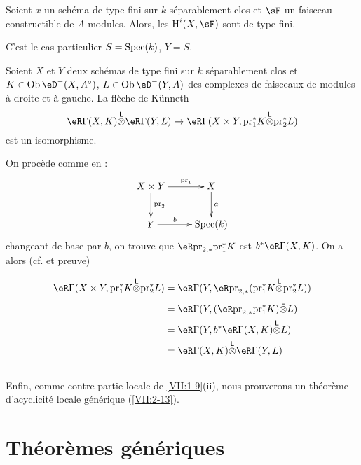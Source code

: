 \begin{corollary_}\label{VII:1-10}
Soient $x$ un schéma de type fini sur $k$ séparablement clos et $\sF$ un 
faisceau constructible de $A$-modules. Alors, les $\h^i(X,\sF)$ sont de type 
fini. 
\end{corollary_}

C'est le cas particulier $S=\operatorname{Spec}(k)$, $Y=S$. 

\begin{corollary_}\label{VII:1-11}
Soient $X$ et $Y$ deux schémas de type fini sur $k$ séparablement clos et 
$K\in \ob\eD^-(X,A^\circ)$, $L\in \ob\eD^-(Y,A)$ des complexes de faisceaux de 
modules à droite et à gauche. La flèche de K\"unneth 
\[
  \eR \Gamma(X,K) \lotimes \eR \Gamma(Y,L) \to \eR\Gamma(X\times Y,\pr_1^\ast K \lotimes \pr_2^\ast L) 
\]
est un isomorphisme. 
\end{corollary_}

On procède comme en \cite[XVII 5.4.3]{sga4}: 
\[\xymatrix{
  X\times Y \ar[r]^-{\text{pr}_1} \ar[d]^-{\text{pr}_2} 
    & X \ar[d]^-a \\
  Y \ar[r]^-b 
    & \spec(k) 
}\]
changeant de base par $b$, on trouve que 
$\eR\pr_{2,\ast}{} \pr_1^\ast K$ est 
$b^\ast \eR\Gamma(X,K)$. On a alors (cf. \cite[XVII 5.2.11]{sga4} et preuve) 

\begin{align*}
  \eR\Gamma(X\times Y,\pr_1^\ast K\lotimes \pr_2^\ast L) 
    &= \eR\Gamma(Y,\eR \pr_{2,\ast}(\pr_1^\ast K\lotimes \pr_2^\ast L)) \\
    &= \eR\Gamma(Y,(\eR\pr_{2,\ast}\pr_1^\ast K)\lotimes L) \\
    &= \eR\Gamma(Y,b^\ast \eR\Gamma(X,K)\lotimes L) \\
    &= \eR\Gamma(X,K)\lotimes \eR\Gamma(Y,L) 
\end{align*}





\subsection{}\label{VII:1-12}

Enfin, comme contre-partie locale de \ref{VII:1-9}(ii), nous prouverons un 
théorème d'acyclicité locale générique (\ref{VII:2-13}). 










\section{Théorèmes génériques}\label{VII:2}

